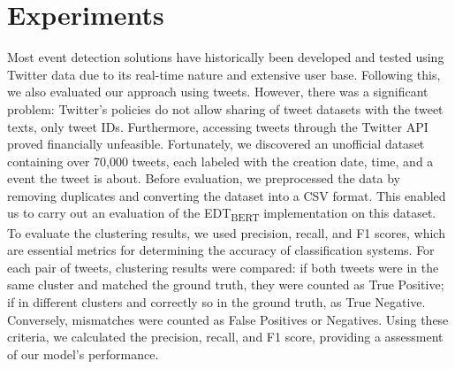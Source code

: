 \section{Experiments}
Most event detection solutions have historically been developed and tested using Twitter data due to its real-time nature and extensive user base. Following this, we also evaluated our approach using tweets. However, there was a significant problem: Twitter’s policies do not allow sharing of tweet datasets with the tweet texts, only tweet IDs. Furthermore, accessing tweets through the Twitter API proved financially unfeasible. Fortunately, we discovered an unofficial dataset containing over 70,000 tweets, each labeled with the creation date, time, and a event the tweet is about. Before evaluation, we preprocessed the data by removing duplicates and converting the dataset into a CSV format. This enabled us to carry out an evaluation of the EDT\textsubscript{BERT} implementation on this dataset. To evaluate the clustering results, we used precision, recall, and F1 scores, which are essential metrics for determining the accuracy of classification systems. For each pair of tweets, clustering results were compared: if both tweets were in the same cluster and matched the ground truth, they were counted as True Positive; if in different clusters and correctly so in the ground truth, as True Negative. Conversely, mismatches were counted as False Positives or Negatives. Using these criteria, we calculated the precision, recall, and F1 score, providing a assessment of our model’s performance.